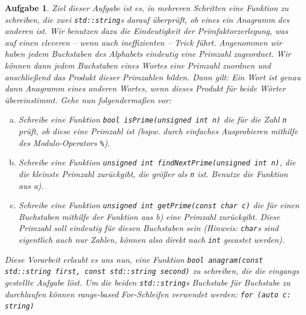 \documentclass[a4paper,12pt,parskip=full]{scrartcl}
\theoremstyle{exercise}
\newtheorem{exercise}{Aufgabe}
\begin{document}
\begin{exercise}
Ziel dieser Aufgabe ist es, in mehreren Schritten eine Funktion zu schreiben, die zwei
\lstinline{std::string}s darauf überprüft, ob eines ein Anagramm des anderen ist.
Wir benutzen dazu die Eindeutigkeit der Primfaktorzerlegung, was auf einen cleveren
-- wenn auch ineffizienten -- Trick führt.
Angenommen wir haben jedem Buchstaben des Alphabets eindeutig eine Primzahl zugeordnet.
Wir können dann jedem Buchstaben eines Wortes eine Primzahl zuordnen und anschließend
das Produkt dieser Primzahlen bilden. Dann gilt: Ein Wort ist genau dann Anagramm
eines anderen Wortes, wenn dieses Produkt für beide Wörter übereinstimmt. Gehe nun folgendermaßen vor:
\begin{enumerate}[a)]
\item Schreibe eine Funktion \lstinline{bool isPrime(unsigned int n)} die für die Zahl \texttt{n} prüft, ob diese eine Primzahl ist (bspw. durch einfaches Ausprobieren mithilfe des Modulo-Operators \texttt{\%}).
\item Schreibe eine Funktion \lstinline{unsigned int findNextPrime(unsigned int n)}, die die kleinste Primzahl zurückgibt, die größer als \texttt{n} ist. Benutze die Funktion aus a).
\item Schreibe eine Funktion \lstinline{unsigned int getPrime(const char c)} die für einen Buchstaben mithilfe der Funktion aus b) eine Primzahl zurückgibt. Diese Primzahl soll eindeutig für diesen Buchstaben sein (Hinweis: \lstinline{char}s sind eigentlich auch nur Zahlen, können also direkt nach \lstinline{int} gecastet werden).
\end{enumerate}
Diese Vorarbeit erlaubt es uns nun, eine Funktion \lstinline{bool anagram(const std::string first, const std::string second)} zu schreiben, die die eingangs gestellte Aufgabe löst. Um die beiden \lstinline{std::string}s Buchstabe für Buchstabe zu durchlaufen können \emph{range-based} For-Schleifen verwendet werden: \lstinline|for (auto c: string)|
\end{exercise}
\end{document}
